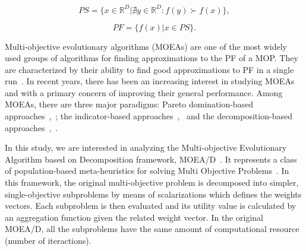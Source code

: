\begin{equation}
PS = \{x \in \mathbb{R}^{D} | \nexists y \in \mathbb{R}^{D} : f(y) \succ f(x)  \},
\end{equation}

\begin{equation}
PF = \{f(x) | x \in PS \}.
\end{equation}

Multi-objective evolutionary algorithms (MOEAs) are one of the most widely used groups of algorithms for finding approximations to the PF of a MOP. They are characterized by their ability to find good approximations to PF in a single run~\cite{zhou2011multiobjective}. In recent years, there has been an increasing interest in studying MOEAs and with a primary concern of improving their general performance. Among MOEAs, there are three major paradigms: Pareto domination-based approaches~\cite{deb2002fast},~\cite{zitzler2001spea2}; the indicator-based approaches~\cite{beume2007sms},~\cite{zitzler2004indicator} and the decomposition-based approaches~\cite{li2009multiobjective},~\cite{zhang2007moea}. 

In this study, we are interested in analyzing the Multi-objective Evolutionary Algorithm based on Decomposition framework, MOEA/D~\cite{zhang2007moea}. It represents a class of population-based meta-heuristics for solving Multi Objective Problems~\cite{trivedi2017survey}. In this framework, the original multi-objective problem is decomposed into simpler, single-objective subproblems by means of scalarizations which defines the weights vectors. Each subproblem is then evaluated and its utility value is calculated by an aggregation function given the related weight vector. In the original MOEA/D, all the subproblems have the same amount of computational resource (number of iteractions). 
%
%
%




